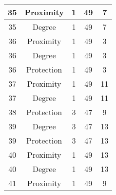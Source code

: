 \documentclass[results.tex]{subfiles}
\begin{document}
\begin{center}
\begin{tabular}{| c || c | c | c | c |}
            \hline
            35                      & Proximity                    & 1                      & 49                      & 7                    \\
            \hline
            35                      & Degree                       & 1                      & 49                      & 7                    \\
            \hline
            36                      & Proximity                    & 1                      & 49                      & 3                    \\
            \hline
            36                      & Degree                       & 1                      & 49                      & 3                    \\
            \hline
            36                      & Protection                   & 1                      & 49                      & 3                    \\
            \hline
            37                      & Proximity                    & 1                      & 49                      & 11                   \\
            \hline
            37                      & Degree                       & 1                      & 49                      & 11                   \\
            \hline
            38                      & Protection                   & 3                      & 47                      & 9                    \\
            \hline
            39                      & Degree                       & 3                      & 47                      & 13                   \\
            \hline
            39                      & Protection                   & 3                      & 47                      & 13                   \\
            \hline
            40                      & Proximity                    & 1                      & 49                      & 13                   \\
            \hline
            40                      & Degree                       & 1                      & 49                      & 13                   \\
            \hline
            41                      & Proximity                    & 1                      & 49                      & 9                    \\

\end{tabular}
\end{center}
\end{document}
